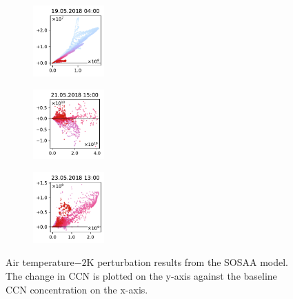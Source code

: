 \begin{figure}[H]
    \begin{subfigure}
        \centering
        \includegraphics[width=0.30\textwidth,valign=t]{evaluation/figures/perturbations/perturbation-19.05.2018:04.00-temperature-sub-2K.pdf}
    \end{subfigure}
    \begin{subfigure}
        \centering
        \includegraphics[width=0.30\textwidth,valign=t]{evaluation/figures/perturbations/perturbation-21.05.2018:15.00-temperature-sub-2K.pdf}
    \end{subfigure}
    \begin{subfigure}
        \centering
        \includegraphics[width=0.30\textwidth,valign=t]{evaluation/figures/perturbations/perturbation-23.05.2018:13.00-temperature-sub-2K.pdf}
    \end{subfigure}

    \caption[Temperature$- 2\text{K}$ perturbation SOSAA results]{Air temperature$- 2\text{K}$ perturbation results from the SOSAA model. The change in CCN is plotted on the y-axis against the baseline CCN concentration on the x-axis.}
    \label{fig:sosaa-perturbation-temperature-sub-2K}
\end{figure}

